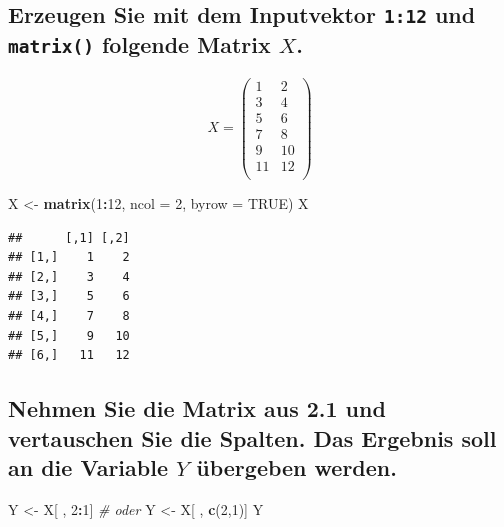 \documentclass[12pt,a4paper]{article}
\newenvironment{Shaded}{\begin{snugshade}}{\end{snugshade}}
\newcommand{\AttributeTok}[1]{\textcolor[rgb]{0.13,0.29,0.53}{#1}}
\newcommand{\CommentTok}[1]{\textcolor[rgb]{0.56,0.35,0.01}{\textit{#1}}}
\newcommand{\ConstantTok}[1]{\textcolor[rgb]{0.56,0.35,0.01}{#1}}
\newcommand{\DecValTok}[1]{\textcolor[rgb]{0.00,0.00,0.81}{#1}}
\newcommand{\FunctionTok}[1]{\textcolor[rgb]{0.13,0.29,0.53}{\textbf{#1}}}
\newcommand{\NormalTok}[1]{#1}
\newcommand{\OtherTok}[1]{\textcolor[rgb]{0.56,0.35,0.01}{#1}}
\newcommand{\SpecialCharTok}[1]{\textcolor[rgb]{0.81,0.36,0.00}{\textbf{#1}}}
\begin{document}
\subsection{\texorpdfstring{Erzeugen Sie mit dem Inputvektor
\texttt{1:12} und \texttt{matrix()} folgende Matrix
\(X\).}{Erzeugen Sie mit dem Inputvektor 1:12 und  folgende Matrix X.}}\label{erzeugen-sie-mit-dem-inputvektor-112-und-folgende-matrix-x.}

\[ X = \begin{pmatrix} 1 & 2 \\ 3 & 4\\ 5 & 6 \\ 7 & 8 \\
9 & 10 \\ 11 & 12 \\\end{pmatrix}\]

\begin{Shaded}
\begin{Highlighting}[]
\NormalTok{    X }\OtherTok{\textless{}{-}} \FunctionTok{matrix}\NormalTok{(}\DecValTok{1}\SpecialCharTok{:}\DecValTok{12}\NormalTok{, }\AttributeTok{ncol =} \DecValTok{2}\NormalTok{, }\AttributeTok{byrow =} \ConstantTok{TRUE}\NormalTok{)}
\NormalTok{    X}
\end{Highlighting}
\end{Shaded}

\begin{verbatim}
##      [,1] [,2]
## [1,]    1    2
## [2,]    3    4
## [3,]    5    6
## [4,]    7    8
## [5,]    9   10
## [6,]   11   12
\end{verbatim}

\vspace{0.5cm}

\subsection{\texorpdfstring{Nehmen Sie die Matrix aus 2.1 und
vertauschen Sie die Spalten. Das Ergebnis soll an die Variable \(Y\)
übergeben
werden.}{Nehmen Sie die Matrix aus 2.1 und vertauschen Sie die Spalten. Das Ergebnis soll an die Variable Y übergeben werden.}}\label{nehmen-sie-die-matrix-aus-2.1-und-vertauschen-sie-die-spalten.-das-ergebnis-soll-an-die-variable-y-uxfcbergeben-werden.}

\begin{Shaded}
\begin{Highlighting}[]
\NormalTok{    Y }\OtherTok{\textless{}{-}}\NormalTok{ X[ , }\DecValTok{2}\SpecialCharTok{:}\DecValTok{1}\NormalTok{] }\CommentTok{\# oder}
\NormalTok{    Y }\OtherTok{\textless{}{-}}\NormalTok{ X[ , }\FunctionTok{c}\NormalTok{(}\DecValTok{2}\NormalTok{,}\DecValTok{1}\NormalTok{)]}
\NormalTok{    Y}
\end{Highlighting}
\end{Shaded}
\end{document}
